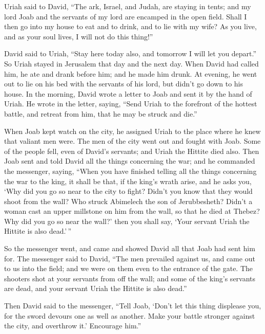 \begin{paracol}{2}
\begin{otherlanguage}{english}
 Uriah said to David, ``The ark, Israel, and Judah, are
staying in tents; and my lord Joab and the servants of my lord are
encamped in the open field. Shall I then go into my house to eat and to
drink, and to lie with my wife? As you live, and as your soul lives, I
will not do this thing!''

 David said to Uriah, ``Stay here today also, and
tomorrow I will let you depart.'' So Uriah stayed in Jerusalem that day
and the next day.  When David had called him, he ate and
drank before him; and he made him drunk. At evening, he went out to lie
on his bed with the servants of his lord, but didn't go down to his
house.  In the morning, David wrote a letter to Joab and
sent it by the hand of Uriah.  He wrote in the letter,
saying, ``Send Uriah to the forefront of the hottest battle, and retreat
from him, that he may be struck and die.''

 When Joab kept watch on the city, he assigned Uriah to
the place where he knew that valiant men were.  The men
of the city went out and fought with Joab. Some of the people fell, even
of David's servants; and Uriah the Hittite died also. 
Then Joab sent and told David all the things concerning the war;
 and he commanded the messenger, saying, ``When you have
finished telling all the things concerning the war to the king,
 it shall be that, if the king's wrath arise, and he asks
you, `Why did you go so near to the city to fight? Didn't you know that
they would shoot from the wall?  Who struck Abimelech the
son of Jerubbesheth? Didn't a woman cast an upper millstone on him from
the wall, so that he died at Thebez? Why did you go so near the wall?'
then you shall say, `Your servant Uriah the Hittite is also dead.'\,''

 So the messenger went, and came and showed David all
that Joab had sent him for.  The messenger said to David,
``The men prevailed against us, and came out to us into the field; and
we were on them even to the entrance of the gate.  The
shooters shot at your servants from off the wall; and some of the king's
servants are dead, and your servant Uriah the Hittite is also dead.''

 Then David said to the messenger, ``Tell Joab, `Don't
let this thing displease you, for the sword devours one as well as
another. Make your battle stronger against the city, and overthrow it.'
Encourage him.''


\end{otherlanguage}
\end{paracol}
